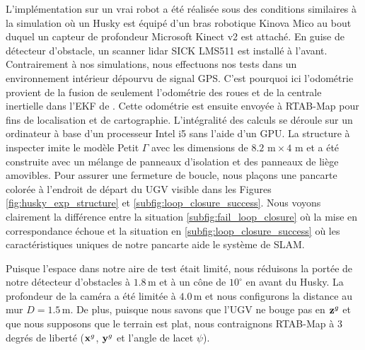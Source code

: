 L'implémentation sur un vrai robot a été réalisée sous des conditions similaires à la simulation où un Husky est équipé d'un bras robotique Kinova Mico au bout duquel un capteur de profondeur Microsoft Kinect v2 est attaché. En guise de détecteur d'obstacle, un scanner lidar SICK LMS511 est installé à l'avant. Contrairement à nos simulations, nous effectuons nos tests dans un environnement intérieur dépourvu de signal GPS. C'est pourquoi ici l'odométrie provient de la fusion de seulement l'odométrie des roues et de la centrale inertielle dans l'EKF de \citep{MooreEkf2014}. Cette odométrie est ensuite envoyée à RTAB-Map \citep{Labbe2014} pour fins de localisation et de cartographie. L'intégralité des calculs se déroule sur un ordinateur à base d'un processeur Intel i5 sans l'aide d'un GPU. La structure à inspecter imite le modèle Petit $\Gamma$ avec les dimensions de $8.2\text{ m} \times 4\text{ m}$ et a été construite avec un mélange de panneaux d'isolation et des panneaux de liège amovibles. Pour assurer une fermeture de boucle, nous plaçons une pancarte colorée à l'endroit de départ du UGV visible dans les Figures \ref{fig:husky_exp_structure} et \ref{subfig:loop_closure_success}. Nous voyons clairement la différence entre la situation \ref{subfig:fail_loop_closure} où la mise en correspondance échoue et la situation en \ref{subfig:loop_closure_success} où les caractéristiques uniques de notre pancarte aide le système de SLAM.

Puisque l'espace dans notre aire de test était limité, nous réduisons la portée de notre détecteur d'obstacles à $1.8\, \mathrm{m}$ et à un cône de $10^\circ$  en avant du Husky. La profondeur de la caméra a été limitée à $4.0\, \mathrm{m}$ et nous configurons la distance au mur $D=1.5\, \mathrm{m}$. De plus, puisque nous savons que l'UGV ne bouge pas en $\mathbf{z}^g$ et que nous supposons que le terrain est plat, nous contraignons RTAB-Map à $3$ degrés de liberté ($\mathbf{x}^g$, $\mathbf{y}^g$ et l'angle de lacet $\psi$).


